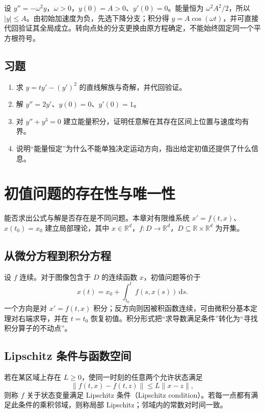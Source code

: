 \documentclass[UTF8,12pt,a4paper,fontset=fandol]{ctexbook}
\begin{document}
\begin{example}
设 $y''=-\omega^2y$，$\omega>0$，$y(0)=A>0$、$y'(0)=0$。能量恒为 $\omega^2A^2/2$，所以 $|y|\leq A$。由初始加速度为负，先选下降分支；积分得 $y=A\cos(\omega t)$，并可直接代回验证其全局成立。转向点处的分支更换由原方程确定，不能始终固定同一个平方根符号。
\end{example}

\section{习题}
\begin{enumerate}
 \item\label{ex:ode-clairaut} 求 $y=ty'-(y')^2$ 的直线解族与奇解，并代回验证。
 \item\label{ex:ode-reduce} 解 $y''=2y'$、$y(0)=0$、$y'(0)=1$。
 \item 对 $y''+y^3=0$ 建立能量积分，证明任意解在其存在区间上位置与速度均有界。
 \item 说明“能量恒定”为什么不能单独决定运动方向，指出给定初值还提供了什么信息。
\end{enumerate}

\chapter{初值问题的存在性与唯一性}
\label{chap:ode-existence}

能否求出公式与解是否存在是不同问题。本章对有限维系统 $x'=f(t,x)$、$x(t_0)=x_0$ 建立局部理论，其中 $x\in\mathbb R^d$，$f:D\to\mathbb R^d$，$D\subseteq\mathbb R\times\mathbb R^d$ 为开集。

\section{从微分方程到积分方程}
设 $f$ 连续。对于图像包含于 $D$ 的连续函数 $x$，初值问题等价于
\begin{equation}
 x(t)=x_0+\int_{t_0}^t f(s,x(s))\,\mathrm ds.
 \label{eq:ode-integral-ivp}
\end{equation}
一个方向是对 $x'=f(t,x)$ 积分；反方向则因被积函数连续，可由微积分基本定理对右端求导，并在 $t=t_0$ 恢复初值。积分形式把“求导数满足条件”转化为“寻找积分算子的不动点”。

\section{Lipschitz 条件与函数空间}
\begin{definition}
若在某区域上存在 $L\geq0$，使同一时刻的任意两个允许状态满足
\[
 \|f(t,x)-f(t,z)\|\leq L\|x-z\|,
\]
则称 $f$ 关于状态变量满足 Lipschitz 条件（Lipschitz condition）。若每一点都有满足此条件的乘积邻域，则称局部 Lipschitz；邻域内的常数对时间一致。
\end{definition}
\end{document}
